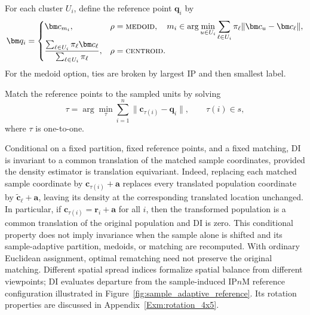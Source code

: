 \State For each cluster \(U_i\), define the reference point \(\bm q_i\) by
\[
\bm q_i
=
\begin{cases}
\bm c_{m_i}, &
\rho=\textsc{medoid},\quad
m_i\in\displaystyle\arg\min_{u\in U_i}
\sum_{\ell\in U_i}\pi_\ell\|\bm c_u-\bm c_\ell\|, \\[2ex]
\displaystyle
\frac{\sum_{\ell\in U_i}\pi_\ell\bm c_\ell}
{\sum_{\ell\in U_i}\pi_\ell}, &
\rho=\textsc{centroid}.
\end{cases}
\]
For the medoid option, ties are broken by largest IP and then smallest label.

\State Match the reference points to the sampled units by solving
\[
\tau
=
\arg\min_{\tau}
\sum_{i=1}^n
\|\bm c_{\tau(i)}-\bm q_i\|,
\qquad
\tau(i)\in s,
\]
where \(\tau\) is one-to-one.

    \item[(iii)] Conditional on a fixed partition, fixed reference points,
and a fixed matching, DI is invariant to a common translation of the matched
sample coordinates, provided the density estimator is translation equivariant.
Indeed, replacing each matched sample coordinate by
\(\bm c_{\tau(i)}+\bm a\) replaces every translated population coordinate
by \(\widetilde{\bm c}_\ell+\bm a\), leaving its density at the corresponding
translated location unchanged. In particular, if
\(\bm c_{\tau(i)}=\bm r_i+\bm a\) for all \(i\), then the transformed
population is a common translation of the original population and DI is zero.
This conditional property does not imply invariance when the sample alone is
shifted and its sample-adaptive partition, medoids, or matching are recomputed.
With ordinary Euclidean assignment, optimal rematching need not preserve the
original matching. Different spatial spread indices formalize spatial balance
from different viewpoints; DI evaluates departure from the sample-induced
IP\(n\)M reference configuration illustrated in
Figure~\ref{fig:sample_adaptive_reference}. Its rotation properties are discussed
in Appendix~\ref{Exm:rotation_4x5}.

